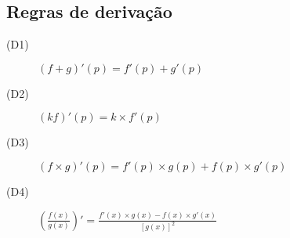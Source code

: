\documentclass[11pt]{article}
\newcommand{\limit}[3]{{
  \underset{#1 \rightarrow #2}{\lim} #3
}}
\begin{document}
\subsection{Regras de derivação}

\begin{description}
  \item[(D1)] $(f+g)'(p) = f'(p) + g'(p)$
  \item[(D2)] $(kf)'(p) = k\times f'(p)$
  \item[(D3)] $(f\times g)'(p) = f'(p)\times g(p) + f(p)\times g'(p)$
  \item[(D4)] $( \frac{f(x)}{g(x)} )' = \frac{f'(x)\times g(x) - f(x)\times
    g'(x)}{[g(x)]^2}$
\end{description}




\end{document}
